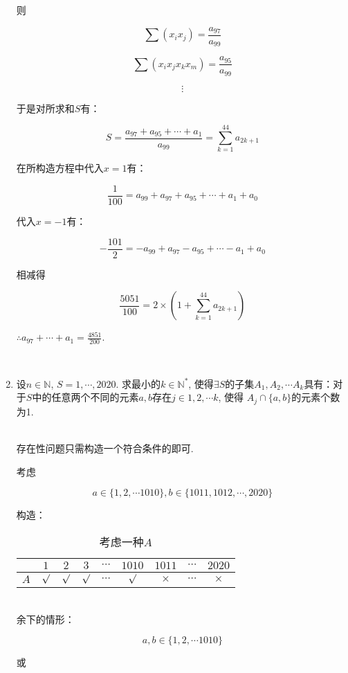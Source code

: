 \documentclass[8pt]{article}
\begin{document}
\begin{enumerate}
			则

			$$\sum (x_i x_j) = \frac{a_{97}}{a_{99}}$$

			$$\sum (x_i x_j x_k x_m) = \frac{a_{95}}{a_{99}}$$

			$$\vdots$$

			于是对所求和$S$有：

			$$S=\frac{a_{97}+a_{95}+\cdots+a_1}{a_{99}}=\sum_{k=1}^{44} a_{2k+1}$$

			在所构造方程中代入$x=1$有：

			$$\frac{1}{100} = a_{99} + a_{97} + a_{95} + \cdots + a_1 + a_0$$

			代入$x=-1$有：

			$$-\frac{101}{2} = - a_{99} + a_{97} - a_{95} + \cdots - a_1 + a_0$$

			相减得

			$$\frac{5051}{100} = 2 \times \left ( 1 + \sum_{k=1}^{44} a_{2k+1} \right )$$

			$\therefore a_{97} + \cdots + a_1 = \frac{4851}{200}$.

		~\\

		\item

			设$n\in\mathbb{N}$, $S={1, \cdots, 2020}$. 求最小的$k \in \mathbb{N}^*$, 使得$\exists S$的子集$A_1, A_2, \cdots A_k$具有：对于$S$中的任意两个不同的元素$a, b$存在$j\in {1, 2, \cdots k}$, 使得 $A_j \cap \{a,b\}$的元素个数为1.

			~\\
			存在性问题只需构造一个符合条件的即可.

			考虑

			$$a \in \{1, 2, \cdots 1010\}, b \in \{1011, 1012, \cdots, 2020\}$$
			
			构造：

			\begin{table}[h]
				\centering
				\begin{tabular}{|c|c|c|c|c|c|c|c|c|}
					\hline &$1$&$2$&$3$&$\cdots$&$1010$&$1011$&$\cdots$&$2020$\\
					\hline $A$&$\surd$&$\surd$&$\surd$&$\cdots$&$\surd$&$\times$&$\cdots$&$\times$\\
					\hline
				\end{tabular}
				\caption{考虑一种$A$}
			\end{table}
			~\\
			余下的情形：

			$$a,b \in \{1, 2, \cdots 1010\}$$

			或


\end{enumerate}
\end{document}
